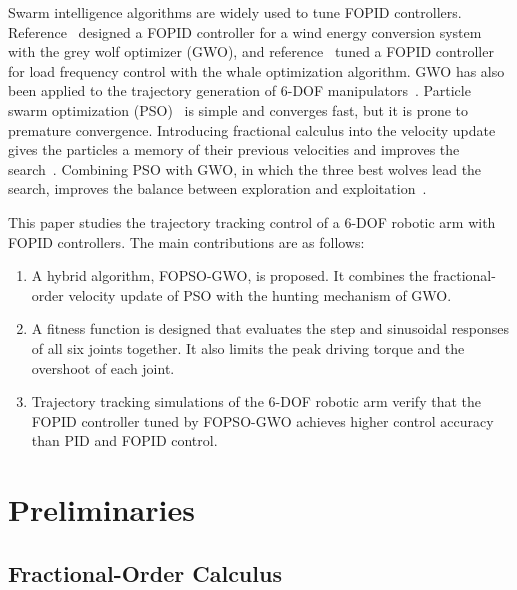 \documentclass{svproc}
\begin{document}
Swarm intelligence algorithms are widely used to tune FOPID controllers.
Reference~\cite{yamparala2022} designed a FOPID controller for a wind energy conversion
system with the grey wolf optimizer (GWO), and reference~\cite{kumar2019} tuned a FOPID
controller for load frequency control with the whale optimization algorithm. GWO has also
been applied to the trajectory generation of 6-DOF manipulators~\cite{choubey2021}.
Particle swarm optimization (PSO)~\cite{kennedy1995,shi1998} is simple and converges fast,
but it is prone to premature convergence. Introducing fractional calculus into the velocity
update gives the particles a memory of their previous velocities and improves the
search~\cite{pires2010,couceiro2016}. Combining PSO with GWO, in which the three best wolves
lead the search, improves the balance between exploration and
exploitation~\cite{mirjalili2014,singh2017}.

This paper studies the trajectory tracking control of a 6-DOF robotic arm with FOPID
controllers. The main contributions are as follows:
\begin{enumerate}
\item A hybrid algorithm, FOPSO-GWO, is proposed. It combines the fractional-order velocity
  update of PSO with the hunting mechanism of GWO.
\item A fitness function is designed that evaluates the step and sinusoidal responses of
  all six joints together. It also limits the peak driving torque and the overshoot of each
  joint.
\item Trajectory tracking simulations of the 6-DOF robotic arm verify that the FOPID
  controller tuned by FOPSO-GWO achieves higher control accuracy than PID and FOPID control.
\end{enumerate}

\section{Preliminaries}

\subsection{Fractional-Order Calculus}
\end{document}
